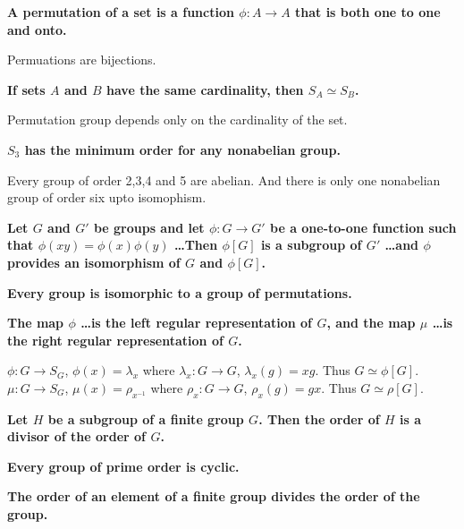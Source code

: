 \documentclass[a4paper,12pt,openany]{book}
\newcommand{\iso}{\simeq} %
\begin{document}
\textbf{\phantom{}}
\textbf{A permutation of a set is a function $\phi : A \to A$ that is both one to one and onto.}\\
\begin{challenge}
	Permuations are bijections.
\end{challenge}

\textbf{\phantom{}}
\textbf{If sets $A$ and $B$ have the same cardinality, then $S_A \iso S_B$.}\\
\begin{story}
	Permutation group depends only on the cardinality of the set.
\end{story}

\textbf{\phantom{}}
\textbf{$S_3$ has the minimum order for any nonabelian group.}\\
\begin{story}
	Every group of order 2,3,4 and 5 are abelian.
	And there is only one nonabelian group of order six upto isomophism.
\end{story}

\textbf{\phantom{}}
\textbf{Let $G$ and $G'$ be groups and let $\phi : G \to G'$ be a one-to-one function such that $\phi(xy) = \phi(x)\phi(y)$ \dots Then $\phi[G]$ is a subgroup of $G'$ \dots and $\phi$ provides an isomorphism of $G$ and $\phi[G]$.}

\textbf{\phantom{}}
\textbf{Every group is isomorphic to a group of permutations.}

\textbf{\phantom{}}
\textbf{The map $\phi$ \dots is the left regular representation of $G$, and the map $\mu$ \dots is the right regular representation of $G$.}\\
\begin{story}
	$\phi : G \to S_G$, $\phi(x) = \lambda_x$ where $\lambda_x : G \to G$, $\lambda_x(g) = xg$.
	Thus $G \iso \phi[G]$.
	$\mu : G \to S_G$, $\mu(x) = \rho_{x^{-1}}$ where $\rho_x : G \to G$, $\rho_x(g) = gx$.
	Thus $G \iso \rho[G]$.
\end{story}

\textbf{\phantom{}}
\textbf{Let $H$ be a subgroup of a finite group $G$. Then the order of $H$ is a divisor of the order of $G$.}

\textbf{\phantom{}}
\textbf{Every group of prime order is cyclic.}

\textbf{\phantom{}}
\textbf{The order of an element of a finite group divides the order of the group.}
\end{document}
